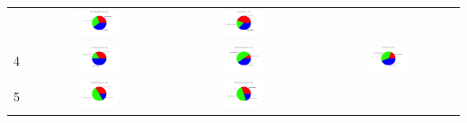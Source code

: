 \begin{table}
\begin{tabular}{ |c|c|c|c| }
    & \includegraphics[width= 0.3\textwidth]{img/L3_NE.png}
    & \includegraphics[width= 0.3\textwidth]{img/L3_all.png}\\  
    4
    & \includegraphics[width= 0.3\textwidth]{img/L4_exp.png}
    & \includegraphics[width= 0.3\textwidth]{img/L4_NE.png}
    & \includegraphics[width= 0.3\textwidth]{img/L4_all.png}\\
    5
    & \includegraphics[width= 0.3\textwidth]{img/L5_exp.png}
    & \includegraphics[width= 0.3\textwidth]{img/L5_NE.png}

\end{tabular}
\end{table}
